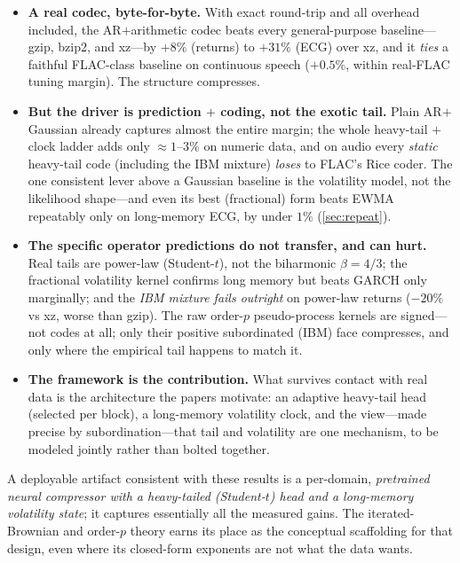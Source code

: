 \documentclass[11pt,reqno]{amsart}
\theoremstyle{plain}
\theoremstyle{definition}
\theoremstyle{remark}
\begin{document}
\begin{itemize}
\item \textbf{A real codec, byte-for-byte.} With exact round-trip and all
  overhead included, the AR$+$arithmetic codec beats every general-purpose
  baseline---gzip, bzip2, and xz---by $+8\%$ (returns) to $+31\%$ (ECG) over
  xz, and it \emph{ties} a faithful FLAC-class baseline on continuous speech
  ($+0.5\%$, within real-FLAC tuning margin). The structure compresses.
\item \textbf{But the driver is prediction $+$ coding, not the exotic tail.}
  Plain AR$+$Gaussian already captures almost the entire margin; the whole
  heavy-tail $+$ clock ladder adds only $\approx1$--$3\%$ on numeric data, and on
  audio every \emph{static} heavy-tail code (including the IBM mixture)
  \emph{loses} to FLAC's Rice coder. The one consistent lever above a Gaussian
  baseline is the volatility model, not the likelihood shape---and even its best
  (fractional) form beats EWMA repeatably only on long-memory ECG, by under
  $1\%$ (\cref{sec:repeat}).
\item \textbf{The specific operator predictions do not transfer, and can hurt.}
  Real tails are power-law (Student-$t$), not the biharmonic $\beta=4/3$; the
  fractional volatility kernel confirms long memory but beats GARCH only
  marginally; and the \emph{IBM mixture fails outright} on power-law returns
  ($-20\%$ vs xz, worse than gzip). The raw order-$p$ pseudo-process kernels are
  signed---not codes at all; only their positive subordinated (IBM) face
  compresses, and only where the empirical tail happens to match it.
\item \textbf{The framework is the contribution.} What survives contact with real
  data is the architecture the papers motivate: an adaptive heavy-tail head
  (selected per block), a long-memory volatility clock, and the view---made
  precise by subordination---that tail and volatility are one mechanism, to be
  modeled jointly rather than bolted together.
\end{itemize}

A deployable artifact consistent with these results is a per-domain,
\emph{pretrained neural compressor with a heavy-tailed (Student-$t$) head and a
long-memory volatility state}; it captures essentially all the measured gains.
The iterated-Brownian and order-$p$ theory earns its place as the conceptual
scaffolding for that design, even where its closed-form exponents are not what
the data wants.
\end{document}
